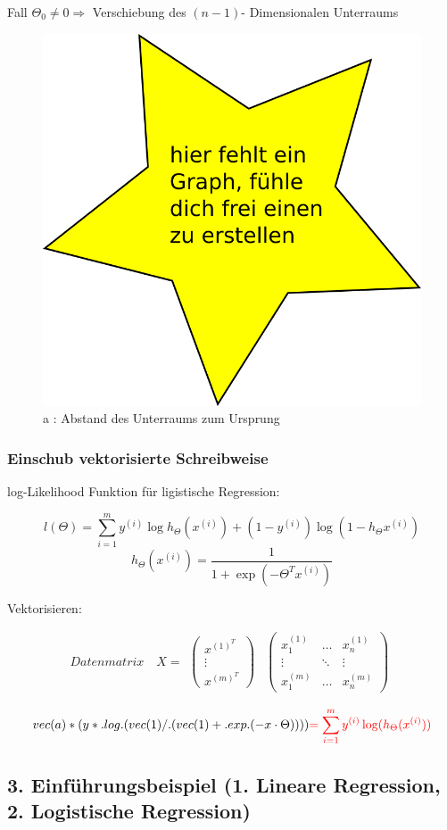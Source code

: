 			 Fall $ \Theta_0 \neq 0 \Rightarrow$ Verschiebung des $ (n-1) $- Dimensionalen Unterraums
			
			\begin{figure}
				\centering
				\includegraphics[width=0.3\linewidth]{graphs/dummy}
				\caption{a : Abstand des Unterraums zum Ursprung}
			\end{figure}
			
			\subsubsection*{Einschub vektorisierte Schreibweise}
			 log-Likelihood Funktion für ligistische Regression:
			
			\[ l(\Theta) = \sum_{i = 1}^{m} y^{(i)} \log h_\Theta (x^{(i)}) + (1 - y^{(i)}) \log(1 - h_\Theta x^{(i)})\]
			\[ h_\Theta (x^{(i)})  = \frac{1}{1 + \exp(- \Theta^T x^{(i)})}\]
			
			 Vektorisieren:
			
			\[Datenmatrix \quad	X = 
				\begin{matrix} \begin{pmatrix} x^{(1)^T} \\ \vdots \\ x^{(m)^T}	\end{pmatrix}  \end{matrix}
				\begin{matrix} \begin{pmatrix} x_1^{(1)} & \dots & x_n^{(1)} \\ \vdots & \ddots & \vdots \\ x_1^{(m)}	& \dots & x_n^{(m)}\end{pmatrix}  \end{matrix} \]
				
			\[ vec(a) * (y*.log.(vec(1)/. (vec(1) +. exp.(-x \cdot \Theta))))  \textcolor{red}{ = \sum_{i = 1}^{m} y^{(i)}\log(h_\Theta(x^{(i)}))}\]
			
			\subsection*{3. Einführungsbeispiel \small{(1. Lineare Regression, 2. Logistische Regression)}}
			
